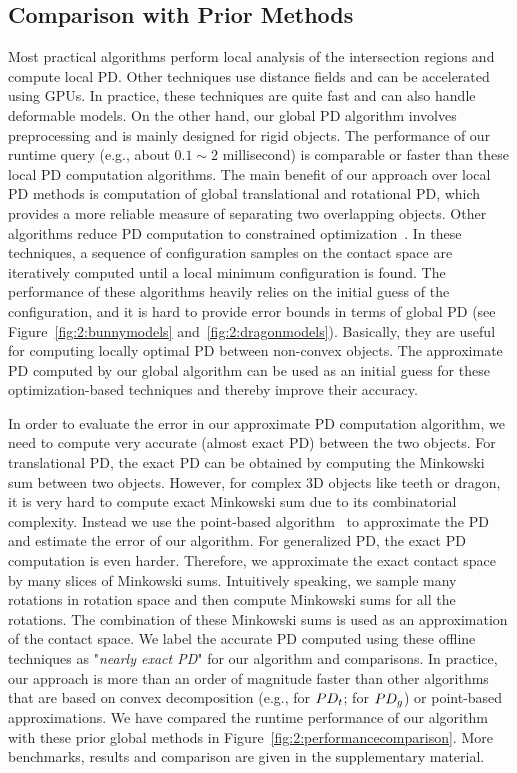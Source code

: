 \subsection{Comparison with Prior Methods}
Most practical algorithms perform local analysis of the intersection regions and
compute local PD. Other techniques use distance fields and can be accelerated using GPUs. In practice, these techniques are quite fast and can also handle
deformable models. On the other hand, our global PD algorithm involves preprocessing and is mainly designed for rigid objects.
The performance of our runtime query (e.g., about $0.1\sim2$ millisecond) is comparable or faster than these local PD computation algorithms. The main benefit of our approach over local PD methods is computation of global
translational and rotational PD, which provides a more reliable measure of separating two overlapping objects.
Other algorithms reduce PD computation to constrained optimization~\cite{Nawratil:2009:GPD,Zhang:2007:AFP,Je:2012:PRP}.
In these techniques, a sequence of configuration samples on the contact space are iteratively
computed until a local minimum configuration is found. The
performance of these algorithms heavily relies on the initial guess of the configuration, and it is hard to provide
error bounds in terms of global PD (see Figure~\ref{fig:2:bunnymodels} and~\ref{fig:2:dragonmodels}). Basically, they are useful for computing locally optimal PD
between non-convex objects. The approximate PD computed by our global algorithm can be used as an initial guess for these optimization-based techniques and thereby improve their accuracy.


In order to evaluate the error in our approximate PD computation algorithm, we need to compute very accurate (almost exact PD) between the two objects. For translational PD, the exact PD can be obtained by computing the Minkowski sum between two objects. However, for complex 3D objects like teeth or dragon, it is very hard to compute exact Minkowski sum due to its combinatorial complexity. Instead we use the point-based algorithm~\cite{Lien:2009:ASM} to approximate the PD and estimate the error of our algorithm.
For generalized PD, the exact PD computation is even harder. Therefore, we approximate the exact contact space by many slices of Minkowski sums. Intuitively speaking, we sample many rotations in rotation space and then compute Minkowski sums for all the rotations. The combination of these Minkowski sums is used as an approximation of the contact space. We label the accurate PD computed using these offline techniques as "\emph{nearly exact PD}" for our algorithm and comparisons.
In practice, our approach is more than an order of magnitude faster than other algorithms that are based on convex decomposition (e.g., \cite{Kim:2002:FPD} for $PD_t$; \cite{Zhang:2007:GPD} for $PD_g$) or point-based approximations. We have compared the runtime performance of our algorithm with these prior global methods in Figure~\ref{fig:2:performancecomparison}. More benchmarks, results and comparison are given in the supplementary material.


